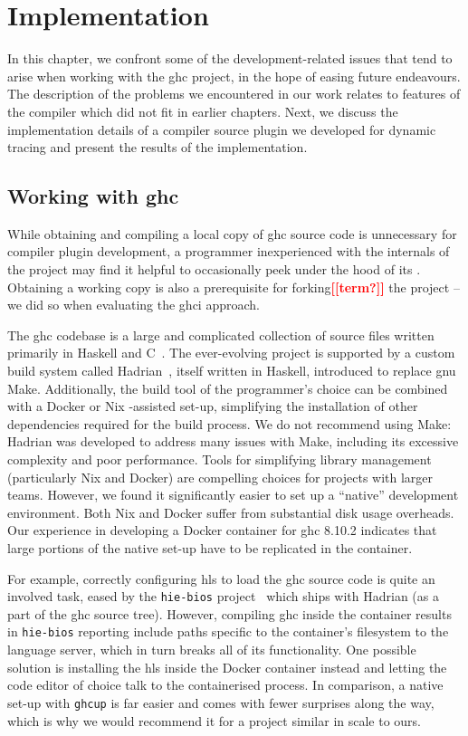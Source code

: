 \documentclass[thesis=B,english]{FITthesis}[2019/12/23]
\newcommand{\todo}[1]{\textcolor{red}{\textbf{[[#1]]}}}
\begin{document}
\chapter{Implementation}
In this chapter, we confront some of the development-related issues that tend
to arise when working with the \acrshort{ghc} project, in the hope of easing
future endeavours. The description of the problems we encountered in our work
relates to features of the compiler which did not fit in earlier chapters.
Next, we discuss the implementation details of a compiler source plugin we
developed for dynamic tracing and present the results of the implementation.


\section{Working with \acrshort{ghc}}
While obtaining and compiling a local copy of \acrshort{ghc} source code is
unnecessary for compiler plugin development, a programmer inexperienced with
the internals of the project may find it helpful to occasionally peek under the
hood of its . Obtaining a working copy is also a prerequisite
for forking\todo{term?} the project -- we did so when evaluating the
\acrshort{ghci} approach.

The \acrshort{ghc} codebase is a large and complicated collection of source
files written primarily in Haskell and C~\cite{arch-ghc}. The ever-evolving
project is supported by a custom build system called Hadrian~\cite{hadrian},
itself written in Haskell, introduced to replace \acrshort{gnu} Make.
Additionally, the build tool of the programmer's choice can be combined with a
Docker or Nix -assisted set-up, simplifying the installation of other
dependencies required for the build process. We do not recommend using Make:
Hadrian was developed to address many issues with Make, including its excessive
complexity and poor performance.  Tools for simplifying library management
(particularly Nix and Docker) are compelling choices for projects with larger
teams. However, we found it significantly easier to set up a ``native''
development environment. Both Nix and Docker suffer from substantial disk usage
overheads. Our experience in developing a Docker container for \acrshort{ghc}
8.10.2 indicates that large portions of the native set-up have to be replicated
in the container.

For example, correctly configuring \acrshort{hls} to load the \acrshort{ghc}
source code is quite an involved task, eased by the \texttt{hie-bios}
project~\cite{gh-hie-bios} which ships with Hadrian (as a part of the
\acrshort{ghc} source tree). However, compiling \acrshort{ghc} inside the
container results in \texttt{hie-bios} reporting include paths specific to the
container's file\-system to the language server, which in turn breaks all of
its functionality. One possible solution is installing the \acrshort{hls}
inside the Docker container instead and letting the code editor of choice talk
to the containerised process. In comparison, a native set-up with
\texttt{ghcup} is far easier and comes with fewer surprises along the way,
which is why we would recommend it for a project similar in scale to ours.
\end{document}
